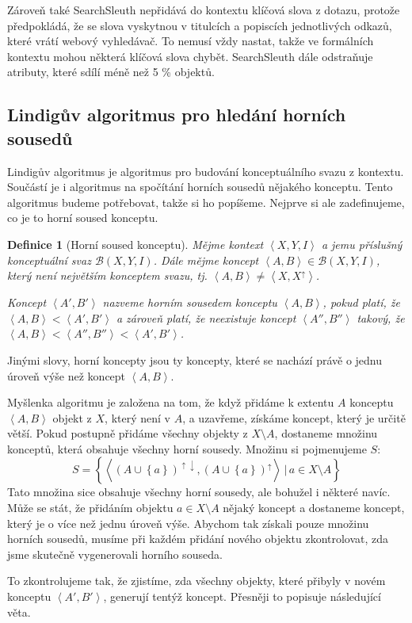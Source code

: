 \documentclass[12pt]{article}
\newcommand{\sep}{\,|\,}
\newcommand{\ssection}[1]{\subsection{#1}}
\newcommand{\adds}[1]{\left\{#1\right\}}
\newcommand{\addsp}[1]{\left<#1\right>}
\newcommand{\context}{\addsp{X, Y, I}}
\newcommand{\lattice}{\mathcal{B}(X, Y, I)}
\newcommand{\up}{^{\uparrow}}
\newcommand{\updown}{^{\uparrow\downarrow}}
\newtheorem{mydef}{Definice}
\begin{document}
Zároveň také SearchSleuth nepřidává do kontextu klíčová slova z dotazu, protože předpokládá, že se slova vyskytnou v titulcích a popiscích jednotlivých odkazů, které vrátí webový vyhledávač. To nemusí vždy nastat, takže ve formálních kontextu mohou některá klíčová slova chybět. SearchSleuth dále odstraňuje atributy, které sdílí méně než 5 \% objektů. 

\ssection{Lindigův algoritmus pro hledání horních sousedů}
Lindigův algoritmus je algoritmus pro budování konceptuálního svazu z kontextu. Součástí je i algoritmus na spočítání horních sousedů nějakého konceptu. Tento algoritmus budeme potřebovat, takže si ho popíšeme. Nejprve si ale zadefinujeme, co je to horní soused konceptu. 

\begin{mydef}[Horní soused konceptu]
Mějme kontext $\context$ a jemu příslušný konceptuální svaz $\lattice$. Dále mějme koncept $\addsp{A, B} \in \lattice$, který není největším konceptem svazu, tj. $\addsp{A, B}\ne\addsp{X, X\up}$. 

Koncept $\addsp{A', B'}$ nazveme horním sousedem konceptu $\addsp{A, B}$, pokud platí, že $\addsp{A, B} < \addsp{A', B'}$ a zároveň platí, že neexistuje koncept $\addsp{A'', B''}$ takový, že $\addsp{A, B} < \addsp{A'', B''} < \addsp{A', B'}$.
\end{mydef}

Jinými slovy, horní koncepty jsou ty koncepty, které se nachází právě o jednu úroveň výše než koncept $\addsp{A, B}$.

Myšlenka algoritmu je založena na tom, že když přidáme k extentu $A$ konceptu $\addsp{A, B}$ objekt z $X$, který není v $A$, a uzavřeme, získáme koncept, který je určitě větší. Pokud postupně přidáme všechny objekty z $X \setminus A$, dostaneme množinu konceptů, která obsahuje všechny horní sousedy. Množinu si pojmenujeme $S$:
$$
S=\adds{\addsp{(A\cup \adds{a})\updown, (A\cup \adds{a})\up}\sep a\in X\setminus A}
$$
Tato množina sice obsahuje všechny horní sousedy, ale bohužel i některé navíc. Může se stát, že přidáním objektu $a\in X\setminus A$  nějaký koncept a dostaneme koncept, který je o více než jednu úroveň výše. Abychom tak získali pouze množinu horních sousedů, musíme při každém přidání nového objektu zkontrolovat, zda jsme skutečně vygenerovali horního souseda. 

To zkontrolujeme tak, že zjistíme, zda všechny objekty, které přibyly v novém konceptu $\addsp{A', B'}$, generují tentýž koncept. Přesněji to popisuje následující věta.
\end{document}
